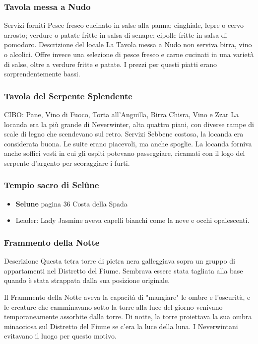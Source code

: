 \documentclass{article}
\begin{document}
              \subsubsection{Tavola messa a Nudo}
Servizi forniti\newline
Pesce fresco cucinato in salse alla panna; cinghiale, lepre o cervo arrosto; verdure o patate fritte in salsa di senape; cipolle fritte in salsa di pomodoro.\newline
Descrizione del locale\newline
La Tavola messa a Nudo non serviva birra, vino o alcolici. Offre invece una selezione di pesce fresco e carne cucinati in una varietà di salse, oltre a verdure fritte e patate. I prezzi per questi piatti erano sorprendentemente bassi.
              \subsubsection{Tavola del Serpente Splendente}
CIBO: Pane, Vino di Fuoco, Torta all'Anguilla, Birra Chisra, Vino e Zzar\newline
La locanda era la più grande di Neverwinter, alta quattro piani, con diverse rampe di scale di legno che scendevano sul retro. Servizi Sebbene costosa, la locanda era considerata buona. Le suite erano piacevoli, ma anche spoglie. La locanda forniva anche soffici vesti in cui gli ospiti potevano passeggiare, ricamati con il logo del serpente d'argento per scoraggiare i furti.
              \subsubsection{Tempio sacro di Selûne}
\begin{itemize}
    \item \textbf{Selune} pagina 36 Costa della Spada
    \item Leader: Lady Jasmine aveva capelli bianchi come la neve e occhi opalescenti.
\end{itemize}
              \subsubsection{Frammento della Notte}
Descrizione\newline
Questa tetra torre di pietra nera galleggiava sopra un gruppo di appartamenti nel Distretto del Fiume. Sembrava essere stata tagliata alla base quando è stata strappata dalla sua posizione originale.

Il Frammento della Notte aveva la capacità di "mangiare" le ombre e l'oscurità, e le creature che camminavano sotto la torre alla luce del giorno venivano temporaneamente assorbite dalla torre. Di notte, la torre proiettava la sua ombra minacciosa sul Distretto del Fiume se c'era la luce della luna. I Neverwintani evitavano il luogo per questo motivo.
\end{document}
